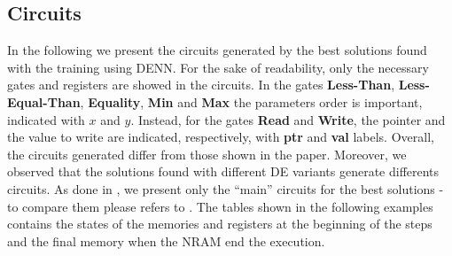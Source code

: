 \subsection{Circuits}\label{subsec:circuits}
In the following we present the circuits generated by the best solutions found with  the training using DENN. For the sake of readability, only the necessary gates and registers are showed in the circuits. In the gates \textbf{Less-Than}, \textbf{Less-Equal-Than}, \textbf{Equality}, \textbf{Min} and \textbf{Max} the parameters order is important, indicated with $x$ and $y$. Instead, for the gates \textbf{Read} and \textbf{Write}, the pointer and the value to write are indicated, respectively, with \textbf{ptr} and \textbf{val} labels.\newline\newline
Overall, the circuits generated differ from those shown in the paper. Moreover, we observed that the solutions found with different DE variants generate differents circuits. As done in \cite{NRAM:2016}, we present only the ``main'' circuits for the best solutions - to compare them please refers to \cite{NRAM:2016}. The tables shown in the following examples contains the states of the memories and registers at the beginning of the steps and the final memory when the NRAM end the execution.
\clearpage

